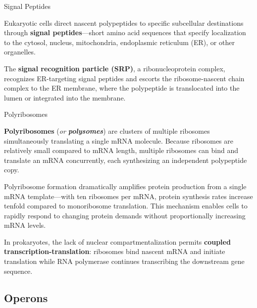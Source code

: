 \documentclass[10pt]{article}
\begin{document}
    \begin{core}{Signal Peptides}

      Eukaryotic cells direct nascent polypeptides to specific subcellular destinations through \textbf{signal peptides}—short amino acid sequences that specify localization to the cytosol, nucleus, mitochondria, endoplasmic reticulum (ER), or other organelles.


      The \textbf{signal recognition particle (SRP)}, a ribonucleoprotein complex, recognizes ER-targeting signal peptides and escorts the ribosome-nascent chain complex to the ER membrane, where the polypeptide is translocated into the lumen or integrated into the membrane.

    \end{core}

    \begin{core}{Polyribosomes}

      \textbf{Polyribosomes} (\textit{or \textbf{polysomes}}) are clusters of multiple ribosomes simultaneously translating a single mRNA molecule. Because ribosomes are relatively small compared to mRNA length, multiple ribosomes can bind and translate an mRNA concurrently, each synthesizing an independent polypeptide copy.

      
      Polyribosome formation dramatically amplifies protein production from a single mRNA template---with ten ribosomes per mRNA, protein synthesis rates increase tenfold compared to monoribosome translation. This mechanism enables cells to rapidly respond to changing protein demands without proportionally increasing mRNA levels.
      
      In prokaryotes, the lack of nuclear compartmentalization permits \textbf{coupled transcription-translation}: ribosomes bind nascent mRNA and initiate translation while RNA polymerase continues transcribing the downstream gene sequence. 


    \end{core}
  
  \subsection{Operons}
\end{document}
